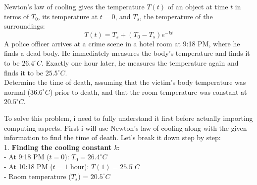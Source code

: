 \documentclass[a4paper, 12pt]{report}
\begin{document}
    \begin{tcolorbox}[title={\color{black}{\section{Q2}}}, colback=white, colframe=black!30!white, boxrule=0.4mm, width=1\textwidth]
        \centering
        Newton's law of cooling gives the temperature \( T(t) \) of an object at time \( t \) in terms of \( T_0 \), its temperature at \( t = 0 \), and \( T_s \), the temperature of the surroundings:
        \[
        T(t) = T_s + (T_0 - T_s)e^{-kt}
        \]
        A police officer arrives at a crime scene in a hotel room at 9:18 PM, where he finds a dead body. He immediately measures the body's temperature and finds it to be \( 26.4^\circ C \). Exactly one hour later, he measures the temperature again and finds it to be \( 25.5^\circ C \).\\[6pt]
        Determine the time of death, assuming that the victim's body temperature was normal (\( 36.6^\circ C \)) prior to death, and that the room temperature was constant at \( 20.5^\circ C \).
    \end{tcolorbox}
    
    To solve this problem, i need to fully understand it first before actually importing computing aspects. First i will use Newton's law of cooling along with the given information to find the time of death. Let's break it down step by step:\\
    
    1. \textbf{Finding the cooling constant \( k \)}:\\
    - At 9:18 PM (\( t = 0 \)): \( T_0 = 26.4^\circ C \)\\
    - At 10:18 PM (\( t = 1 \) hour): \( T(1) = 25.5^\circ C \)\\
    - Room temperature (\( T_s \)) = \( 20.5^\circ C \)\\
    
\end{document}
